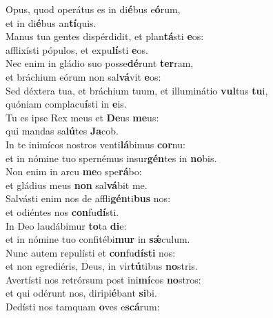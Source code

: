 \evenverse Opus, quod operátus es in di\textbf{é}bus e\textbf{ó}rum,~\*\\
\evenverse et in di\textbf{é}bus an\textbf{tí}quis.\\
\oddverse Manus tua gentes dispérdidit, et plan\textbf{tá}sti \textbf{e}os:~\*\\
\oddverse afflixísti pópulos, et expu\textbf{lí}sti \textbf{e}os.\\
\evenverse Nec enim in gládio suo posse\textbf{dé}runt \textbf{ter}ram,~\*\\
\evenverse et bráchium eórum non sal\textbf{vá}vit \textbf{e}os:\\
\oddverse Sed déxtera tua, et bráchium tuum, et illuminátio \textbf{vul}tus \textbf{tu}i,~\*\\
\oddverse quóniam complacu\textbf{í}sti in \textbf{e}is.\\
\evenverse Tu es ipse Rex meus et \textbf{De}us \textbf{me}us:~\*\\
\evenverse qui mandas sa\textbf{lú}tes \textbf{Ja}cob.\\
\oddverse In te inimícos nostros venti\textbf{lá}bimus \textbf{cor}nu:~\*\\
\oddverse et in nómine tuo spernémus insur\textbf{gén}tes in \textbf{no}bis.\\
\evenverse Non enim in arcu \textbf{me}o spe\textbf{rá}bo:~\*\\
\evenverse et gládius meus \textbf{non} sal\textbf{vá}bit me.\\
\oddverse Salvásti enim nos de affli\textbf{gén}ti\textbf{bus} nos:~\*\\
\oddverse et odiéntes nos \textbf{con}fu\textbf{dí}sti.\\
\evenverse In Deo laudábimur \textbf{to}ta \textbf{di}e:~\*\\
\evenverse et in nómine tuo confitébi\textbf{mur} in \textbf{sǽ}culum.\\
\oddverse Nunc autem repulísti et \textbf{con}fu\textbf{dí}\textbf{sti} nos:~\*\\
\oddverse et non egrediéris, Deus, in vir\textbf{tú}tibus \textbf{no}stris.\\
\evenverse Avertísti nos retrórsum post ini\textbf{mí}cos \textbf{no}stros:~\*\\
\evenverse et qui odérunt nos, diripi\textbf{é}bant \textbf{si}bi.\\
\oddverse Dedísti nos tamquam \textbf{o}ves e\textbf{scá}rum:~\*\\
